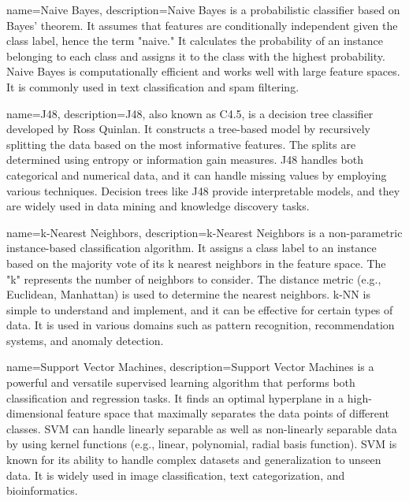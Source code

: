 {
    name=Naive Bayes,
    description={Naive Bayes is a probabilistic classifier based on Bayes' theorem. It assumes that features are conditionally independent given the class label, hence the term "naive." It calculates the probability of an instance belonging to each class and assigns it to the class with the highest probability. Naive Bayes is computationally efficient and works well with large feature spaces. It is commonly used in text classification and spam filtering.}
}

{
name=J48,
description={J48, also known as C4.5, is a decision tree classifier developed by Ross Quinlan. It constructs a tree-based model by recursively splitting the data based on the most informative features. The splits are determined using entropy or information gain measures. J48 handles both categorical and numerical data, and it can handle missing values by employing various techniques. Decision trees like J48 provide interpretable models, and they are widely used in data mining and knowledge discovery tasks.}
}

{
name=k-Nearest Neighbors,
description={k-Nearest Neighbors is a non-parametric instance-based classification algorithm. It assigns a class label to an instance based on the majority vote of its k nearest neighbors in the feature space. The "k" represents the number of neighbors to consider. The distance metric (e.g., Euclidean, Manhattan) is used to determine the nearest neighbors. k-NN is simple to understand and implement, and it can be effective for certain types of data. It is used in various domains such as pattern recognition, recommendation systems, and anomaly detection.}
}

{
name=Support Vector Machines,
description={Support Vector Machines is a powerful and versatile supervised learning algorithm that performs both classification and regression tasks. It finds an optimal hyperplane in a high-dimensional feature space that maximally separates the data points of different classes. SVM can handle linearly separable as well as non-linearly separable data by using kernel functions (e.g., linear, polynomial, radial basis function). SVM is known for its ability to handle complex datasets and generalization to unseen data. It is widely used in image classification, text categorization, and bioinformatics.}
}

